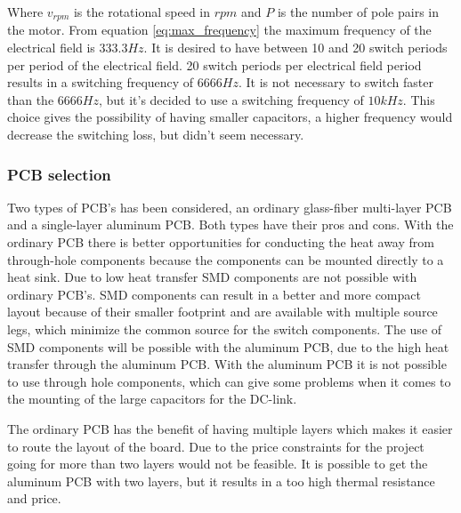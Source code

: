 Where $v_{rpm}$ is the rotational speed in $rpm$ and $P$ is the number of pole pairs in the motor.
From equation \ref{eq:max_frequency} the maximum frequency of the electrical field is $333.3 Hz$.
It is desired to have between 10 and 20 switch periods per period of the electrical field. 20 switch periods per electrical field period results in a switching frequency of $6666 Hz$. It is not necessary to switch faster than the $6666 Hz$, but it's decided to use a switching frequency of $10 kHz$. This choice gives the possibility of having smaller capacitors, a higher frequency would decrease the switching loss, but didn't seem necessary. 


\subsubsection{PCB selection}   \label{PCB_selection}
Two types of PCB's has been considered, an ordinary glass-fiber multi-layer PCB and a single-layer aluminum PCB. Both types have their pros and cons. With the ordinary PCB there is better opportunities for conducting the heat away from through-hole components because the components can be mounted directly to a heat sink. Due to low heat transfer SMD components are not possible with ordinary PCB's.
SMD components can result in a better and more compact layout because of their smaller footprint and are available with multiple source legs, which minimize the common source for the switch components. 
The use of SMD components will be possible with the aluminum PCB, due to the high heat transfer through the aluminum PCB.
With the aluminum PCB it is not possible to use through hole components, which can give some problems when it comes to the mounting of the large capacitors for the DC-link. 

The ordinary PCB has the benefit of having multiple layers which makes it easier to route the layout of the board. Due to the price constraints for the project going for more than two layers would not be feasible. It is possible to get the aluminum PCB with two layers, but it results in a too high thermal resistance and price.


